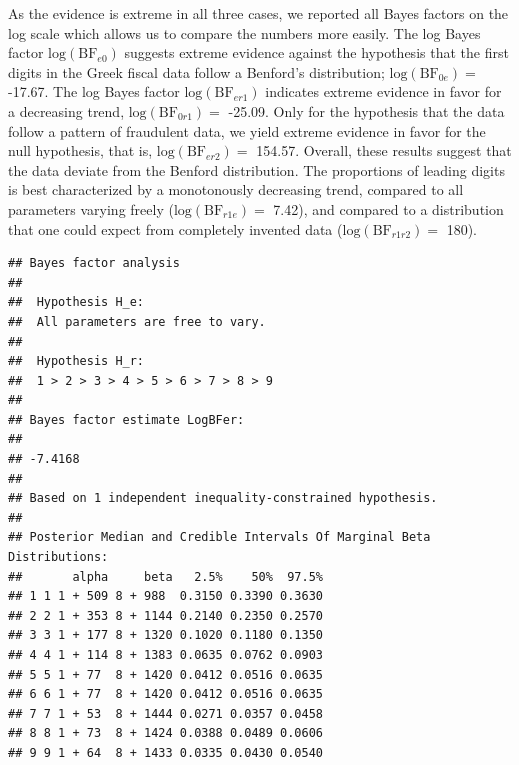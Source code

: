 \documentclass[
  english,
  man,floatsintext]{apa6}
\begin{document}
As the evidence is extreme in all three cases, we reported all Bayes factors on the log scale which allows us to compare the numbers more easily. The log Bayes factor \(\text{log}(\text{BF}_{e0})\) suggests extreme evidence against the hypothesis that the first digits in the Greek fiscal data follow a Benford's distribution; \(\text{log}(\text{BF}_{0e}) =\) -17.67. The log Bayes factor \(\text{log}(\text{BF}_{er1})\) indicates extreme evidence in favor for a decreasing trend, \(\text{log}(\text{BF}_{0r1}) =\) -25.09. Only for the hypothesis that the data follow a pattern of fraudulent data, we yield extreme evidence in favor for the null hypothesis, that is, \(\text{log}(\text{BF}_{er2}) =\) 154.57. Overall, these results suggest that the data deviate from the Benford distribution.
The proportions of leading digits is best characterized by a monotonously decreasing trend, compared to all parameters varying freely (\(\text{log}(\text{BF}_{r1e}) =\) 7.42), and compared to a distribution that one could expect from completely invented data (\(\text{log}(\text{BF}_{r1r2}) =\) 180).




\begin{verbatim}
## Bayes factor analysis
## 
##  Hypothesis H_e:
##  All parameters are free to vary.
## 
##  Hypothesis H_r:
##  1 > 2 > 3 > 4 > 5 > 6 > 7 > 8 > 9 
## 
## Bayes factor estimate LogBFer:
## 
## -7.4168
## 
## Based on 1 independent inequality-constrained hypothesis.
## 
## Posterior Median and Credible Intervals Of Marginal Beta Distributions:
##       alpha     beta   2.5%    50%  97.5%
## 1 1 1 + 509 8 + 988  0.3150 0.3390 0.3630
## 2 2 1 + 353 8 + 1144 0.2140 0.2350 0.2570
## 3 3 1 + 177 8 + 1320 0.1020 0.1180 0.1350
## 4 4 1 + 114 8 + 1383 0.0635 0.0762 0.0903
## 5 5 1 + 77  8 + 1420 0.0412 0.0516 0.0635
## 6 6 1 + 77  8 + 1420 0.0412 0.0516 0.0635
## 7 7 1 + 53  8 + 1444 0.0271 0.0357 0.0458
## 8 8 1 + 73  8 + 1424 0.0388 0.0489 0.0606
## 9 9 1 + 64  8 + 1433 0.0335 0.0430 0.0540
\end{verbatim}
\end{document}
